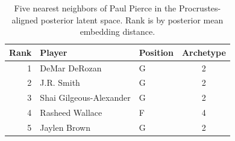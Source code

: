 \begin{table}[htbp]
  \centering\small
  \begin{tabular}{rllc}
    \toprule
    Rank & Player & Position & Archetype \\
    \midrule
    1 & DeMar DeRozan & G & 2 \\
    2 & J.R. Smith & G & 2 \\
    3 & Shai Gilgeous-Alexander & G & 2 \\
    4 & Rasheed Wallace & F & 4 \\
    5 & Jaylen Brown & G & 2 \\
    \bottomrule
  \end{tabular}
  \caption{Five nearest neighbors of Paul Pierce in the Procrustes-aligned posterior latent space. Rank is by posterior mean embedding distance.}
  \label{tab:Paul_Pierce_neighbors}
\end{table}

